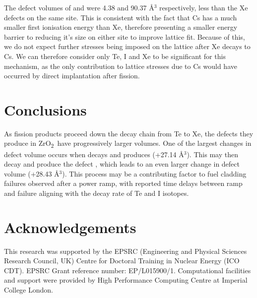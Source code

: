 \documentclass[11pt,a4paper]{article}
\newcommand{\zirconia}{ZrO\textsubscript{2}}
\begin{document}
The defect volumes of  and  were 4.38 and 90.37 \r{A}$^{3}$ respectively, less than the Xe defects on the same site. This is consistent with the fact that Cs has a much smaller first ionisation energy than Xe, therefore presenting a smaller energy barrier to reducing it's size on either site to improve lattice fit. Because of this, we do not expect further stresses being imposed on the lattice after Xe decays to Cs. We can therefore consider only Te, I and Xe to be significant for this mechanism, as the only contribution to lattice stresses due to Cs would have occurred by direct implantation after fission. 



\section*{Conclusions}

As fission products proceed down the decay chain from Te to Xe, the defects they produce in \zirconia\ have progressively larger volumes. One of the largest changes in defect volume occurs when  decays and produces  (+27.14 \r{A}$^{3}$). This may then decay and produce the defect , which leads to an even larger change in defect volume (+28.43 \r{A}$^{3}$). This process may be a contributing factor to fuel cladding failures observed after a power ramp, with reported time delays between ramp and failure aligning with the decay rate of Te and I isotopes. 

\section*{Acknowledgements}

This research was supported by the EPSRC (Engineering and Physical Sciences Research Council, UK) Centre for Doctoral Training in Nuclear Energy (ICO CDT). EPSRC Grant reference number: EP/L015900/1. Computational facilities and support were provided by High Performance Computing Centre at Imperial College
London.


\clearpage

\label{References}


\end{document}
